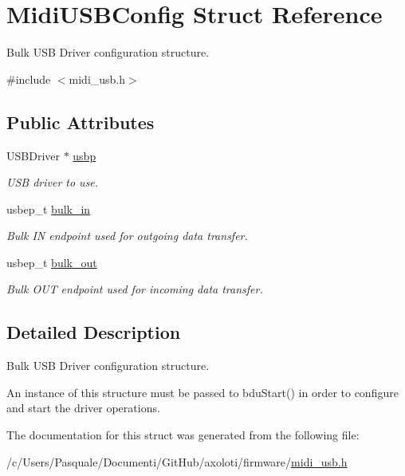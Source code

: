 \hypertarget{structMidiUSBConfig}{}\section{Midi\+U\+S\+B\+Config Struct Reference}
\label{structMidiUSBConfig}


Bulk U\+SB Driver configuration structure.  




{\ttfamily \#include $<$midi\+\_\+usb.\+h$>$}

\subsection*{Public Attributes}
\begin{DoxyCompactItemize}
\item 
U\+S\+B\+Driver $\ast$ \hyperlink{structMidiUSBConfig_a790053d1fd7606f3b36d0935c65ade23}{usbp}\hypertarget{structMidiUSBConfig_a790053d1fd7606f3b36d0935c65ade23}{}\label{structMidiUSBConfig_a790053d1fd7606f3b36d0935c65ade23}

\begin{DoxyCompactList}\small\item\em U\+SB driver to use. \end{DoxyCompactList}\item 
usbep\+\_\+t \hyperlink{structMidiUSBConfig_af491dd47cc82b3ec77af8f9b00e5e939}{bulk\+\_\+in}\hypertarget{structMidiUSBConfig_af491dd47cc82b3ec77af8f9b00e5e939}{}\label{structMidiUSBConfig_af491dd47cc82b3ec77af8f9b00e5e939}

\begin{DoxyCompactList}\small\item\em Bulk IN endpoint used for outgoing data transfer. \end{DoxyCompactList}\item 
usbep\+\_\+t \hyperlink{structMidiUSBConfig_a8b878c797ca1c216baf2ecf6626ed919}{bulk\+\_\+out}\hypertarget{structMidiUSBConfig_a8b878c797ca1c216baf2ecf6626ed919}{}\label{structMidiUSBConfig_a8b878c797ca1c216baf2ecf6626ed919}

\begin{DoxyCompactList}\small\item\em Bulk O\+UT endpoint used for incoming data transfer. \end{DoxyCompactList}\end{DoxyCompactItemize}


\subsection{Detailed Description}
Bulk U\+SB Driver configuration structure. 

An instance of this structure must be passed to {\ttfamily bdu\+Start()} in order to configure and start the driver operations. 

The documentation for this struct was generated from the following file\+:\begin{DoxyCompactItemize}
\item 
/c/\+Users/\+Pasquale/\+Documenti/\+Git\+Hub/axoloti/firmware/\hyperlink{midi__usb_8h}{midi\+\_\+usb.\+h}\end{DoxyCompactItemize}
